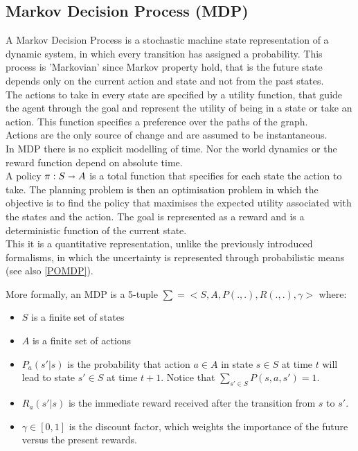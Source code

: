 \documentclass[pdftex,12pt,a4paper]{report}
\begin{document}
\subsection{Markov Decision Process (MDP)}\label{MDP}
\noindent A Markov Decision Process is a stochastic machine state representation of a dynamic system, in which every transition has assigned a probability. This process  is 'Markovian' since Markov property hold, that is the future state depends only on the current action and state and not from the past states.   
\\\noindent The actions to take in every state are specified by a utility function, that guide the agent through the goal and represent the utility of being in a state or take an action. This function specifies a preference over the paths of the graph.
\\\noindent Actions are the only source of change and are assumed to be instantaneous.
\\\noindent In MDP there is no explicit modelling of time. Nor the world dynamics or the reward function depend on absolute time.
\\\noindent A policy $\pi : S \shortrightarrow A$ is a total function that specifies for each state the action to take. The planning problem is then an optimisation problem in which the objective is to find the policy that maximises the expected utility associated with the states and the action.
The goal is represented as a reward and is a deterministic function of the current state.
\\\noindent This it is a quantitative representation, unlike the previously introduced formalisms, in which the uncertainty is represented through probabilistic means (see also \ref{POMDP}).
\newline

\noindent More formally, an MDP is a 5-tuple $\sum = <S, A, P(.,.), R(.,.), \gamma >$ where:
\begin{itemize}
\item $S$ is a finite set of states
\item $A$ is a finite set of actions
\item $P_a(s'|s)$ is the probability that action $ a \in A$ in state $ s \in S$ at time $t$ will lead to state $s' \in S$ at time $t+1$. Notice that $\sum_{s'\in S} P(s,a,s')=1$.
\item $R_a(s'|s)$ is the immediate reward received after the transition from $s$ to $s'$.
\item $\gamma \in [0,1]$ is the discount factor, which weights the importance of the future versus the present rewards.
\end{itemize}
\end{document}
